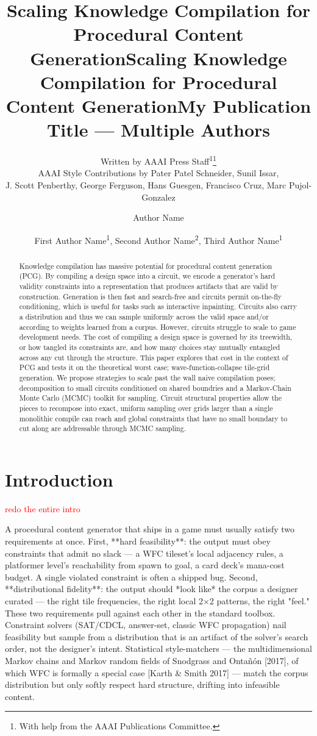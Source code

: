 \documentclass[letterpaper]{article} %
\title{Scaling Knowledge Compilation for Procedural Content Generation}
\author{
    Written by AAAI Press Staff\textsuperscript{\rm 1}\thanks{With help from the AAAI Publications Committee.}\\
    AAAI Style Contributions by Pater Patel Schneider,
    Sunil Issar,\\
    J. Scott Penberthy,
    George Ferguson,
    Hans Guesgen,
    Francisco Cruz\equalcontrib,
    Marc Pujol-Gonzalez\equalcontrib
}
\title{Scaling Knowledge Compilation for Procedural Content Generation}
\author {
    Author Name
}
\title{My Publication Title --- Multiple Authors}
\author {
    First Author Name\textsuperscript{\rm 1},
    Second Author Name\textsuperscript{\rm 2},
    Third Author Name\textsuperscript{\rm 1}
}
\newcommand{\todo}[1]{\textcolor{red}{#1}}
\begin{document}
\maketitle

\begin{abstract}
Knowledge compilation has massive potential for procedural content generation (PCG). By compiling a design space into a circuit, we encode a generator's hard validity constraints into a representation that produces artifacts that are valid by construction. Generation is then fast and search-free and circuits permit on-the-fly conditioning, which is useful for tasks such as interactive inpainting. Circuits also carry a distribution and thus we can sample uniformly across the valid space and/or according to weights learned from a corpus. However, circuits struggle to scale to game development needs. The cost of compiling a design space is governed by its treewidth, or how tangled its constraints are, and how many choices stay mutually entangled across any cut through the structure. This paper explores that cost in the context of PCG and tests it on the theoretical worst case; wave-function-collapse tile-grid generation. We propose strategies to scale past the wall naive compilation poses; decomposition to small circuits conditioned on shared boundries and a Markov-Chain Monte Carlo (MCMC) toolkit for sampling. Circuit structural properties allow the pieces to recompose into exact, uniform sampling over grids larger than a single monolithic compile can reach and global constraints that have no small boundary to cut along are addressable through MCMC sampling.
\end{abstract}

\section{Introduction}

\todo{redo the entire intro}

A procedural content generator that ships in a game must usually satisfy two requirements at once.
First, **hard feasibility**: the output must obey constraints that admit no slack — a WFC tileset's
local adjacency rules, a platformer level's reachability from spawn to goal, a card deck's mana-cost
budget. A single violated constraint is often a shipped bug. Second, **distributional fidelity**:
the output should *look like* the corpus a designer curated — the right tile frequencies, the right
local 2×2 patterns, the right "feel." These two requirements pull against each other in the standard
toolbox. Constraint solvers (SAT/CDCL, answer-set, classic WFC propagation) nail feasibility but
sample from a distribution that is an artifact of the solver's search order, not the designer's
intent. Statistical style-matchers — the multidimensional Markov chains and Markov random fields of
Snodgrass and Ontañón [2017], of which WFC is formally a special case [Karth & Smith 2017] — match
the corpus distribution but only softly respect hard structure, drifting into infeasible content.
\end{document}
